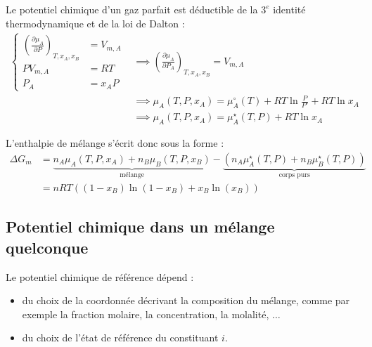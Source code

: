 \documentclass[a4paper]{book}
\begin{document}
Le potentiel chimique d'un gaz parfait est déductible de la $3^e$ identité thermodynamique et de la loi de Dalton : 
\begin{align*}
\begin{cases}
\left(\frac{\partial \mu_A}{\partial P} \right)_{T, x_A, x_B} &= V_{m, A} \\
P V_{m,A} &= RT \\
P_A &= x_A P
\end{cases} &\implies \left(\frac{\partial \mu_A}{\partial P_A} \right)_{T, x_A, x_B} = V_{m, A} \\ &\implies \mu_A (T, P, x_A) = \mu_A^\circ (T) + RT \ln  \frac{P}{P^\circ} + RT \ln x_A \\
&\implies \mu_A (T, P, x_A) =  \mu^\star_A (T, P) + RT \ln x_A
\end{align*}

L'enthalpie de mélange s'écrit donc sous la forme :
\begin{align*}
\Delta G_m &= \underbrace{n_A \mu_A (T, P, x_A) + n_B \mu_B (T, P, x_B)}_{\text{mélange}} -  \underbrace{\left( n_A \mu^\star_A (T, P) + n_B \mu^\star_B (T, P) \right)}_{\text{corps purs}} \\
&= n RT \left( (1-x_B) \ln (1- x_B) + x_B \ln ( x_B )\right)
\end{align*}



\subsection{Potentiel chimique dans un mélange quelconque}


Le potentiel chimique de référence dépend :
\begin{itemize}
\item du choix de la coordonnée décrivant la composition du mélange, comme par exemple la fraction molaire, la concentration, la molalité, $\ldots$
\item du choix de l'état de référence du constituant $i$.
\end{itemize}
\end{document}
